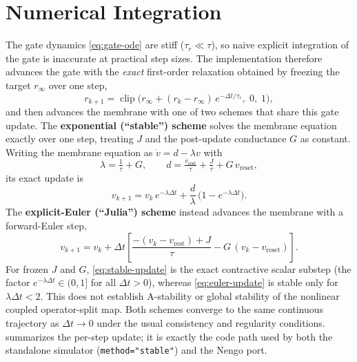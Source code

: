 \documentclass[11pt]{article}
\newcommand{\vr}{v_{\mathrm{rest}}}
\newcommand{\vre}{v_{\mathrm{reset}}}
\newcommand{\rinf}{r_{\infty}}
\newcommand{\code}[1]{\texttt{#1}}
\begin{document}
\section{Numerical Integration}\label{sec:integration}
The gate dynamics \cref{eq:gate-ode} are stiff ($\tau_r\ll\tau$), so naive
explicit integration of the gate is inaccurate at practical step sizes. The
implementation therefore advances the gate with the \emph{exact} first-order
relaxation obtained by freezing the target $\rinf$ over one step,
\begin{equation}
  r_{k+1} = \operatorname{clip}\!\Big(\rinf + (r_k-\rinf)\,e^{-\Delta t/\tau_r},
  \; 0,\; 1\Big), \label{eq:gate-update}
\end{equation}
and then advances the membrane with one of two schemes that share this gate
update. The \textbf{exponential (``stable'') scheme} solves the membrane
equation exactly over one step, treating $J$ and the post-update conductance
$G$ as constant. Writing the membrane equation as
$\dot v = d - \lambda v$ with
\begin{equation}
  \lambda = \tfrac{1}{\tau} + G, \qquad
  d = \tfrac{\vr}{\tau} + \tfrac{J}{\tau} + G\,\vre,
  \label{eq:lambda-drive}
\end{equation}
its exact update is
\begin{equation}
  v_{k+1} = v_k\,e^{-\lambda\Delta t}
            + \frac{d}{\lambda}\,\big(1-e^{-\lambda\Delta t}\big).
  \label{eq:stable-update}
\end{equation}
The \textbf{explicit-Euler (``Julia'') scheme} instead advances the membrane
with a forward-Euler step,
\begin{equation}
  v_{k+1} = v_k + \Delta t\!\left[\frac{-(v_k-\vr)+J}{\tau} - G\,(v_k-\vre)\right].
  \label{eq:euler-update}
\end{equation}
For frozen $J$ and $G$, \cref{eq:stable-update} is the exact contractive scalar
substep (the factor $e^{-\lambda\Delta t}\in(0,1]$ for all $\Delta t>0$),
whereas \cref{eq:euler-update} is stable only for $\lambda\Delta t<2$. This
does not establish A-stability or global stability of the nonlinear coupled
operator-split map. Both schemes converge to the same continuous trajectory as
$\Delta t\to 0$ under the usual consistency and regularity conditions.
 summarizes the per-step update; it is exactly the code path used
by both the standalone simulator (\code{method="stable"}) and the Nengo port.
\end{document}
